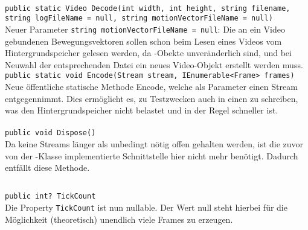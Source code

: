 \paragraph{}
\begin{itemize}
	\add \verb!public static Video Decode(int width, int height, string filename, string logFileName = null, string motionVectorFileName = null)! \\
	Neuer Parameter \verb!string motionVectorFileName = null!: Die an ein Video gebundenen Bewegungsvektoren sollen schon beim Lesen eines Videos vom Hintergrundspeicher gelesen werden, da -Obekte unveränderlich sind, und bei Neuwahl der entsprechenden Datei ein neues Video-Objekt erstellt werden muss.
	\add \verb!public static void Encode(Stream stream, IEnumerable<Frame> frames)! \\
	Neue öffentliche statische Methode Encode, welche als Parameter einen Stream entgegennimmt. Dies ermöglicht es, zu Testzwecken auch in einen  zu schreiben, was den Hintergrundspeicher nicht belastet und in der Regel schneller ist.
\end{itemize}

\paragraph{}
\begin{itemize}
	\remove \verb!public void Dispose()! \\
	Da keine Streams länger als unbedingt nötig offen gehalten werden, ist die zuvor von der -Klasse implementierte Schnittstelle  hier nicht mehr benötigt. Dadurch entfällt diese Methode.
\end{itemize}


\subsection{}

\paragraph{}
\begin{itemize}
	\change \verb!public int? TickCount! \\
	Die Property \verb!TickCount! ist nun nullable. Der Wert null steht hierbei für die Möglichkeit (theoretisch) unendlich viele Frames zu erzeugen.
\end{itemize}

